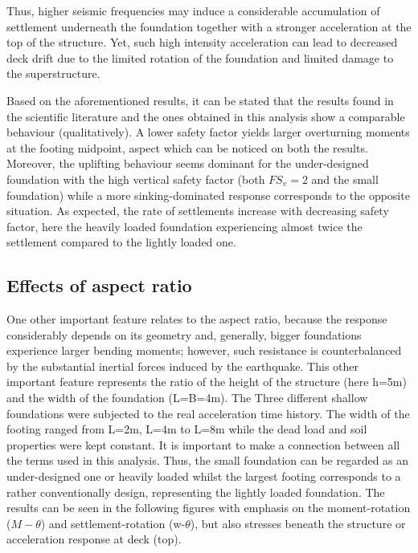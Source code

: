  Thus, higher seismic frequencies may induce a considerable accumulation of settlement \mbox{underneath} the foundation together with a stronger acceleration at the top of the structure. Yet, such high intensity acceleration can lead to decreased deck drift due to the limited rotation of the foundation and limited damage to the superstructure.
 
 
 Based on the aforementioned results, it can be stated that the results found in the scientific literature and the ones obtained in this analysis show a comparable behaviour (qualitatively). A lower safety factor yields larger overturning moments at the footing midpoint, aspect which can be noticed on both the results. Moreover, the uplifting behaviour seems dominant for the under-designed foundation with the high vertical safety factor (both $FS_v=2$ and the small foundation) while a more sinking-dominated response corresponds to the opposite situation. As expected, the rate of settlements increase with decreasing safety factor, here the heavily loaded foundation experiencing almost twice the settlement compared to the lightly loaded one.
 
\newpage
\subsection{Effects of aspect ratio}
One other important feature relates to the aspect ratio, because the response considerably depends on its geometry and, generally, bigger foundations experience larger bending moments; however, such resistance is counterbalanced by the substantial inertial forces induced by the earthquake.  This other important feature represents the ratio of the height of the structure (here h=5m) and the width of the foundation (L=B=4m). The Three different shallow foundations were subjected to the real acceleration time history. The width of the footing ranged from L=2m, L=4m to L=8m while the dead load and soil properties were kept constant. It is important to make a connection between all the terms used in this analysis. Thus, the small foundation can be regarded as an under-designed one or heavily loaded whilst the largest footing corresponds to a rather conventionally design, representing the lightly loaded foundation. The results can be seen in the following figures with emphasis on the moment-rotation ($M-\theta$) and settlement-rotation (\gls{w}-$\theta$), but also stresses beneath the structure or acceleration response at deck (top).


